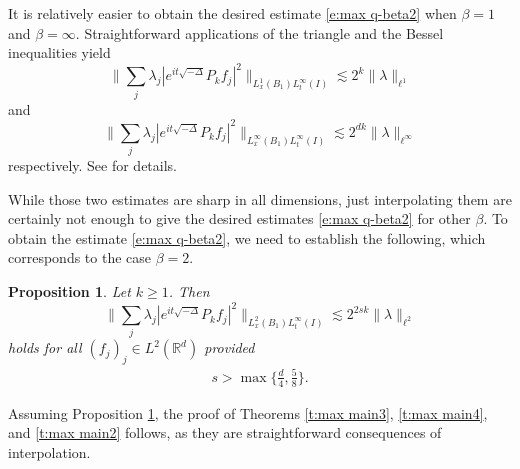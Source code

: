 \documentclass[a4paper]{amsart}
\numberwithin{figure}{section}
\numberwithin{equation}{section}%
\theoremstyle{plain}%
\newtheorem{proposition}[theorem]{Proposition}
\theoremstyle{definition}
\theoremstyle{remark}%
\newcommand{\R}{{\mathbb R}}
\begin{document}
It is relatively easier to obtain the desired estimate \eqref{e:max q-beta2} 
when $\beta=1$ and $\beta=\infty$. Straightforward applications of the triangle and the Bessel inequalities yield 
\begin{equation}\label{e:Cinfty trivial}
\Big\|\sum_j \lambda_j|e^{it\sqrt{-\Delta}}P_kf_j|^2 \Big\|_{L_x^1(B_1) L_t^\infty(I)}
\lesssim
2^k  \|\lambda\|_{\ell^1}
\end{equation}
and 
\begin{equation}\label{e:C1 trivial}
\Big\|\sum_j \lambda_j|e^{it\sqrt{-\Delta}}P_kf_j|^2 \Big\|_{L_x^\infty(B_1) L_t^\infty(I)}
\lesssim
2^{dk}\|\lambda\|_{\ell^\infty}
\end{equation}
 respectively. 
See \cite{BHLNS, KKS} for details.

While those two estimates are sharp in all dimensions,  just interpolating them are certainly not enough to 
give the desired estimates \eqref{e:max q-beta2} for other $\beta$.
To obtain the estimate \eqref{e:max q-beta2}, 
we need to establish the following, which corresponds to the case $\beta=2$.
\begin{proposition}\label{prop:222}
Let $k\ge1$. Then
\begin{equation}\label{222}
\Big\|\sum_j \lambda_j|e^{it\sqrt{-\Delta}}P_kf_j|^2 \Big\|_{L_x^2(B_1) L_t^\infty(I)}
\lesssim
2^{2sk}\|\lambda\|_{\ell^2}
\end{equation}
holds for all $(f_j)_j \in L^2(\R^d)$  provided 
\begin{align}\label{SSSS}
s>\max \Big\{\frac d4, \frac 5{8} \Big\}.
\end{align}
\end{proposition}

Assuming Proposition \ref{prop:222}, the proof of Theorems \ref{t:max main3}, \ref{t:max main4}, and \ref{t:max main2} follows, as they are straightforward consequences of interpolation. 
\end{document}

